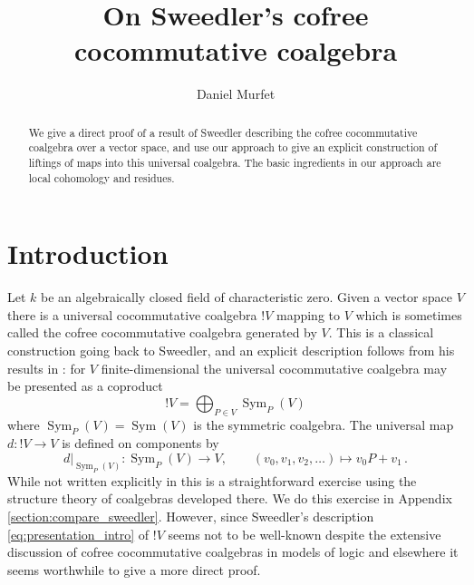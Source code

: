 \documentclass[english,letter paper,12pt,reqno]{article}
\theoremstyle{example}
\numberwithin{equation}{section}
\def\res{\operatorname{Res}}
\DeclareMathOperator{\Sym}{Sym}
\begin{document}
\def\ScoreOverhang{1pt}

\def\Res{\res\!}
\newcommand{\ud}[1]{\operatorname{d}\!{#1}}
\newcommand{\Ress}[1]{\res_{#1}\!}
\newcommand{\cat}[1]{\mathcal{#1}}
\newcommand{\lto}{\longrightarrow}
\newcommand{\xlto}[1]{\stackrel{#1}\lto}
\newcommand{\mf}[1]{\mathfrak{#1}}
\newcommand{\md}[1]{\mathscr{#1}}
\newcommand{\church}[1]{\underline{#1}}
\newcommand{\prf}[1]{\underline{#1}}
\newcommand{\den}[1]{\llbracket #1 \rrbracket}
\def\l{\,|\,}
\def\sgn{\textup{sgn}}
\def\cont{\operatorname{cont}}

\title{On Sweedler's cofree cocommutative coalgebra}
\author{Daniel Murfet}

\maketitle

\begin{abstract} We give a direct proof of a result of Sweedler describing the cofree cocommutative coalgebra over a vector space, and use our approach to give an explicit construction of liftings of maps into this universal coalgebra. The basic ingredients in our approach are local cohomology and residues.
\end{abstract}

\section{Introduction}

Let $k$ be an algebraically closed field of characteristic zero. Given a vector space $V$ there is a universal cocommutative coalgebra ${!}V$ mapping to $V$ which is sometimes called the cofree cocommutative coalgebra generated by $V$. This is a classical construction going back to Sweedler, and an explicit description follows from his results in \cite{sweedler}: for $V$ finite-dimensional the universal cocommutative coalgebra may be presented as a coproduct
\begin{equation}\label{eq:presentation_intro}
{!} V = \bigoplus_{P \in V} \Sym_P(V)
\end{equation}
where $\Sym_P(V) = \Sym(V)$ is the symmetric coalgebra. The universal map $d: {!} V \lto V$ is defined on components by
\[
d|_{\Sym_P(V)}: \Sym_P(V) \lto V, \qquad (v_0,v_1,v_2,\ldots) \longmapsto v_0 P + v_1\,.
\]
While not written explicitly in \cite{sweedler} this is a straightforward exercise using the structure theory of coalgebras developed there. We do this exercise in Appendix \ref{section:compare_sweedler}. However, since Sweedler's description \eqref{eq:presentation_intro} of ${!} V$ seems not to be well-known despite the extensive discussion of cofree cocommutative coalgebras in models of logic \cite{blute,hyland,mellies2,schreiber} and elsewhere it seems worthwhile to give a more direct proof. 
\end{document}
